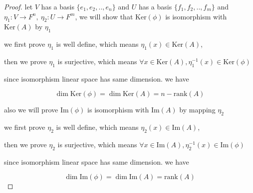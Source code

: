 \begin{proof}
    let $V$ has a basis $\{ e_1, e_2, .., e_n \}$ and $U$ has a basis $\{ f_1,f_2,..,f_m\}$ 
    and $\eta_1: V \to F^n,\: \eta_2: U \to F^m$, we will show that $\mathrm{Ker}(\phi)$ is isomorphism with $\mathrm{Ker}(A)$ by $\eta_1$

    we first prove $\eta_1$ is well define, which means $\eta_1(x) \in \mathrm{Ker}(A)$,

    then we prove $\eta_1$ is surjective, which means $\forall x \in \mathrm{Ker}(A), \eta_1^{-1}(x) \in \mathrm{Ker}(\phi)$

    since isomorphism linear space has same dimension. we have

    \[
        \dim \mathrm{Ker}(\phi) = \dim \mathrm{Ker}(A) = n - \mathrm{rank}(A)
    \]

    also we will prove $\mathrm{Im}(\phi)$ is isomorphism with $\mathrm{Im}(A)$ by mapping $\eta_2$

    we first prove $\eta_2$ is well define, which means $\eta_2(x) \in \mathrm{Im}(A)$,


    then we prove $\eta_2$ is surjective, which means $\forall x \in \mathrm{Im}(A), \eta_2^{-1}(x) \in \mathrm{Im}(\phi)$

    since isomorphism linear space has same dimension. we have

    \[
        \dim \mathrm{Im}(\phi) = \dim \mathrm{Im}(A) = \mathrm{rank}(A)
    \]
\end{proof}